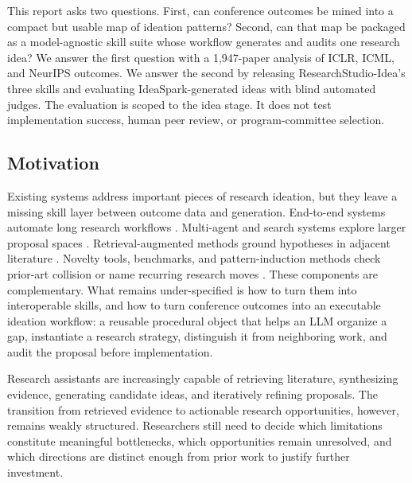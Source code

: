 \documentclass[10pt,a4paper]{article}
\begin{document}
This report asks two questions. First, can conference outcomes be mined into a compact but usable map of ideation patterns? Second, can that map be packaged as a model-agnostic skill suite whose workflow generates and audits one research idea? We answer the first question with a 1{,}947-paper analysis of ICLR, ICML, and NeurIPS outcomes. We answer the second by releasing ResearchStudio-Idea's three skills and evaluating IdeaSpark-generated ideas with blind automated judges. The evaluation is scoped to the idea stage. It does not test implementation success, human peer review, or program-committee selection.

\subsection{Motivation}

Existing systems address important pieces of research ideation, but they leave a missing skill layer between outcome data and generation. End-to-end systems automate long research workflows \cite{lu2024aiscientist,agentlab2025,airesearcher2025,from_automation_2025}. Multi-agent and search systems explore larger proposal spaces \cite{deepideation2025,nova2024,wang2026flowpie,multiworkflow2026,alienscience2026}. Retrieval-augmented methods ground hypotheses in adjacent literature \cite{lewis2020rag,scimuse2024,kghyp2024,gao2026graphsofresearch}. Novelty tools, benchmarks, and pattern-induction methods check prior-art collision or name recurring research moves \cite{novbench2026,opennovelty2026,graphmind2025,litgrounded2025,schopf2026rinobench,wang2024scireasoning,moRI2026,motivgraph2025,navigating_ideation2026}. These components are complementary. What remains under-specified is how to turn them into interoperable skills, and how to turn conference outcomes into an executable ideation workflow: a reusable procedural object that helps an LLM organize a gap, instantiate a research strategy, distinguish it from neighboring work, and audit the proposal before implementation.

Research assistants are increasingly capable of retrieving literature, synthesizing evidence, generating candidate ideas, and iteratively refining proposals. The transition from retrieved evidence to actionable research opportunities, however, remains weakly structured. Researchers still need to decide which limitations constitute meaningful bottlenecks, which opportunities remain unresolved, and which directions are distinct enough from prior work to justify further investment.
\end{document}
